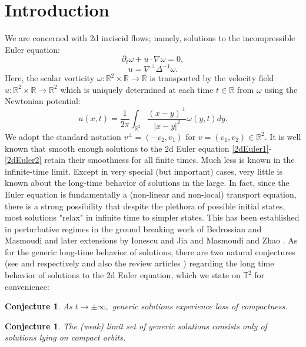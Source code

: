 \documentclass[10pt]{article}
\numberwithin{equation}{section}
\theoremstyle{plain}
\newtheorem{conj}[lemma]{Conjecture}
\theoremstyle{definition}
\numberwithin{equation}{section}
\begin{document}
\section{Introduction}
We are concerned with 2d inviscid flows; namely, solutions to the incompressible Euler equation:
\begin{equation}
    \label{2dEuler1} \partial_t \omega + u\cdot\nabla \omega=0,
\end{equation}
\begin{equation}\label{2dEuler2}
    u=\nabla^\perp \Delta^{-1}\omega.
\end{equation}
Here, the scalar vorticity $\omega:\mathbb{R}^2\times \mathbb{R}\rightarrow\mathbb{R}$ is transported by the velocity field $u:\mathbb{R}^2\times\mathbb{R}\rightarrow\mathbb{R}^2$ which is uniquely determined at each time $t\in\mathbb{R}$ from $\omega$ using the Newtonian potential:
\begin{equation}\label{Newtonian}u(x,t)=\frac{1}{2\pi}\int_{\mathbb{R}^2}\frac{(x-y)^\perp}{|x-y|^2}\omega(y,t)dy.\end{equation} We adopt the standard notation $v^\perp=(-v_2, v_1)$ for $v=(v_1,v_2)\in\mathbb{R}^2.$ It is well known that smooth enough solutions to the 2d Euler equation \eqref{2dEuler1}-\eqref{2dEuler2} retain their smoothness for all finite times. Much less is known in the infinite-time limit. Except in very special (but important) cases, very little is known about the long-time behavior of solutions in the large. In fact, since the Euler equation is fundamentally a (non-linear and non-local) transport equation, there is a strong possibility that despite the plethora of possible initial states, most solutions "relax" in infinite time to simpler states. This has been established in perturbative regimes in the ground breaking work of Bedrossian and Masmoudi \cite{BedrossianMasmoudi} and later extensions by Ionescu and Jia \cite{IonescuJia1,IonescuJia2} and Masmoudi and Zhao \cite{MasmoudiZhao}. As for the generic long-time behavior of solutions, there are two natural conjectures (see \cite{Sverakcours} and \cite{Shnirelman} respectively and also the review articles \cite{ED-review,Shnirelman-turvey}) regarding the long time behavior of solutions to the 2d Euler equation, which we state on $\mathbb{T}^2$ for convenience:
\begin{conj}
As $t\rightarrow\pm\infty,$ generic solutions experience loss of compactness.
\end{conj}

\begin{conj}
The (weak) limit set of generic solutions consists only of solutions lying on compact orbits. 
\end{conj}
\end{document}
